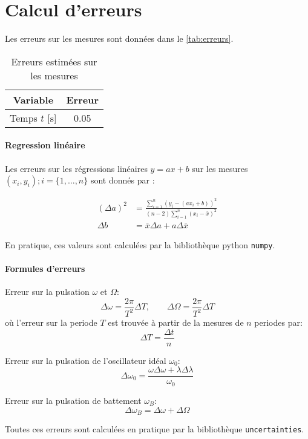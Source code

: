 \section{Calcul d'erreurs}
\label{sec:erreurs}

Les erreurs sur les mesures sont données dans le \autoref{tab:erreurs}.

\begin{table}[h]
    \centering
    \begin{tabulary}{\textwidth}{C C}
        \toprule
        Variable & Erreur \\
        \midrule
        Temps \(t\) [\si{\second}] & 0.05 \\
        \bottomrule
    \end{tabulary}
    \caption{Erreurs estimées sur les mesures}
    \label{tab:erreurs}
\end{table}

\paragraph*{Regression linéaire}
Les erreurs sur les régressions linéaires \(y = ax + b\) sur les mesures \((x_i, y_i) ; i = \{1, \dots, n\}\) sont donnés par \cite{erreursmesure}:

\begin{equation}
    \label{eq:erreur:fit}
    \begin{aligned}
        (\Delta a)^2 &= \frac{\sum_{i=1}^{n}(y_i - (a x_i + b))^2}{(n-2) \sum_{i=1}^{n}(x_i - \bar{x})^2}\\
        \Delta b &= \bar{x} \Delta a + a \Delta \bar{x}
    \end{aligned}
\end{equation}

En pratique, ces valeurs sont calculées par la bibliothèque python \texttt{numpy}.

\paragraph*{Formules d'erreurs}

Erreur sur la pulsation \(\omega\) et \(\Omega\):
\begin{equation}
    \Delta \omega = \frac{2 \pi}{T^2} \Delta T, \qquad
    \Delta \Omega = \frac{2 \pi}{T^2} \Delta T
\end{equation}
où l'erreur sur la periode \(T\) est trouvée à partir de la mesures de \(n\) periodes par:
\begin{equation}
    \Delta T = \frac{\Delta t}{n}
\end{equation}

Erreur sur la pulsation de l'oscillateur idéal \(\omega_0\):
\begin{equation}
    \Delta \omega_0 = \frac{\omega \Delta \omega + \lambda \Delta \lambda}{\omega_0}
\end{equation}

Erreur sur la pulsation de battement \(\omega_B\):
\begin{equation}
    \Delta \omega_B = \Delta \omega + \Delta \Omega
\end{equation}

Toutes ces erreurs sont calculées en pratique par la bibliothèque \texttt{uncertainties}.
